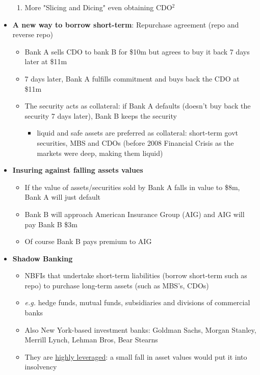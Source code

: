 \documentclass{article}
\newcommand{\eg}[0]{\textit{e.g. }}
\begin{document}
\begin{multicols}{2}
\begin{itemize}
\begin{enumerate}
        \item More "Slicing and Dicing" even obtaining CDO$^2$
    \end{enumerate}
    \item \textbf{A new way to borrow short-term}: Repurchase agreement (repo and reverse repo)
    \begin{itemize}
    	\item Bank A sells CDO to bank B for \$10m but agrees to buy it back 7 days later at \$11m
    	\item 7 days later, Bank A fulfills commitment and buys back the CDO at \$11m
    	\item The security acts as collateral: if Bank A defaults (doesn't buy back the security 7 days later), Bank B keeps the security
    	\begin{itemize}
    		\item liquid and safe assets are preferred as collateral: short-term govt securities, MBS and CDOs (before 2008 Financial Crisis as the markets were deep, making them liquid)
    	\end{itemize}
    \end{itemize}
    \item \textbf{Insuring against falling assets values}
    \begin{itemize}
    	\item If the value of assets/securities sold by Bank A falls in value to \$8m, Bank A will just default
    	\item Bank B will approach American Insurance Group (AIG) and AIG will pay Bank B \$3m
    	\item Of course Bank B pays premium to AIG
    \end{itemize}
    \item \textbf{Shadow Banking}
    \begin{itemize}
    	\item NBFIs that undertake short-term liabilities (borrow short-term such as repo) to purchase long-term assets (such as MBS's, CDOs)
    	\item \eg hedge funds, mutual funds, subsidiaries and divisions of commercial banks
    	\item Also New York-based investment banks: Goldman Sachs, Morgan Stanley, Merrill Lynch, Lehman Bros, Bear Stearns
    	\item They are \underline{highly leveraged}: a small fall in asset values would put it into insolvency
    \end{itemize}
\end{itemize}

\end{multicols}
\end{document}

